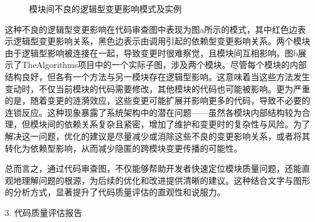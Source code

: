 \begin{figure}[!h]
    \setlength{\subfigcapskip}{-1bp}
    \centering
    \begin{minipage}{\textwidth}
    \centering
    \hspace{2em}
    \end{minipage}
    \vspace{0.2em}
    \caption{模块间不良的逻辑型变更影响模式及实例} %
\end{figure}


这种不良的逻辑型变更影响在代码审查图中表现为图a所示的模式，其中红色边表示逻辑型变更影响关系，黑色边表示由调用引起的依赖型变更影响关系。两个模块由于逻辑型影响被连接在一起，导致变更时很难察觉，且模块间互相影响。图b展示了TheAlgorithms项目中的一个实际子图，涉及两个模块。尽管每个模块的内部结构良好，但各有一个方法与另一模块存在逻辑型影响。这意味着当这些方法发生变动时，不仅当前模块的代码需要修改，其他模块的代码也可能被影响。更为严重的是，随着变更的涟漪效应，这些变更可能扩展并影响更多的代码，导致不必要的连锁反应。这种现象暴露了系统架构中的潜在问题——虽然各模块内部结构较为合理，但模块间的依赖关系复杂且紧密，增加了维护和变更时的复杂性与风险。为了解决这一问题，优化的建议是尽量减少或消除这些不良的变更影响关系，或者将其转化为依赖型影响，从而减少隐匿的跨模块变更传播的可能性。


总而言之，通过代码审查图，不仅能够帮助开发者快速定位模块质量问题，还能直观地理解问题的根源，为后续的优化和改进提供清晰的建议。这种结合文字与图形的分析方式，显著提升了代码质量评估的直观性和说服力。

3. 代码质量评估报告

